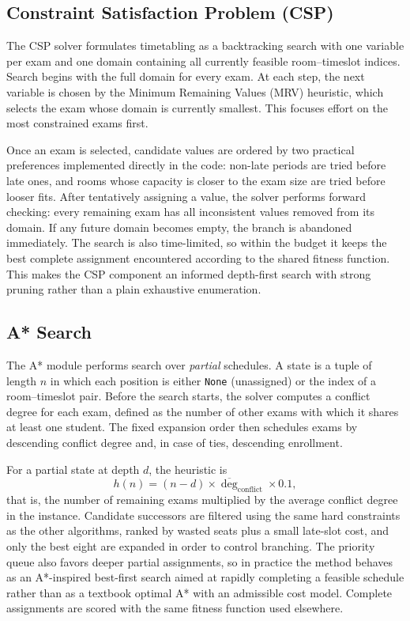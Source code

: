 \subsection{Constraint Satisfaction Problem (CSP)}

The CSP solver formulates timetabling as a backtracking search with one
variable per exam and one domain containing all currently feasible
room--timeslot indices. Search begins with the full domain for every
exam. At each step, the next variable is chosen by the Minimum
Remaining Values (MRV) heuristic, which selects the exam whose domain is
currently smallest. This focuses effort on the most constrained exams
first.

Once an exam is selected, candidate values are ordered by two practical
preferences implemented directly in the code: non-late periods are tried
before late ones, and rooms whose capacity is closer to the exam size
are tried before looser fits. After tentatively assigning a value, the
solver performs forward checking: every remaining exam has all
inconsistent values removed from its domain. If any future domain
becomes empty, the branch is abandoned immediately. The search is also
time-limited, so within the budget it keeps the best complete assignment
encountered according to the shared fitness function. This makes the CSP
component an informed depth-first search with strong pruning rather than
a plain exhaustive enumeration.

\subsection{A* Search}

The A* module performs search over \emph{partial} schedules. A state is a
tuple of length $n$ in which each position is either \texttt{None}
(unassigned) or the index of a room--timeslot pair. Before the search
starts, the solver computes a conflict degree for each exam, defined as
the number of other exams with which it shares at least one student. The
fixed expansion order then schedules exams by descending conflict degree
and, in case of ties, descending enrollment.

For a partial state at depth $d$, the heuristic is
\[
h(n) = (n-d)\times \overline{\deg}_{\text{conflict}} \times 0.1,
\]
that is, the number of remaining exams multiplied by the average
conflict degree in the instance. Candidate successors are filtered using
the same hard constraints as the other algorithms, ranked by wasted
seats plus a small late-slot cost, and only the best eight are expanded
in order to control branching. The priority queue also favors deeper
partial assignments, so in practice the method behaves as an A*-inspired
best-first search aimed at rapidly completing a feasible schedule rather
than as a textbook optimal A* with an admissible cost model. Complete
assignments are scored with the same fitness function used elsewhere.

